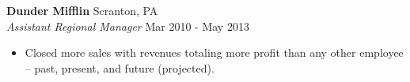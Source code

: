 \textbf{Dunder Mifflin} \hfill Scranton, PA\\
\textit{Assistant Regional Manager} \hfill Mar 2010 - May 2013\\
\vspace*{-4pt}
\begin{itemize} \itemsep 1pt
	\item Closed more sales with revenues totaling more profit than any other employee – past, present, and future (projected).
\end{itemize}
